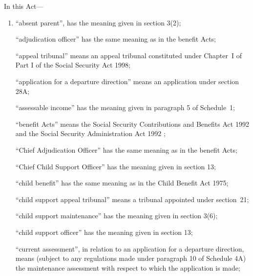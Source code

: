 \documentclass[12pt,a4paper]{article}
\begin{document}
In this Act—
\begin{enumerate}\item[]
    “absent parent”, has the meaning given in section 3(2);

    “adjudication officer” has the same meaning as in the benefit Acts;

“appeal tribunal” means an appeal tribunal constituted under Chapter~I of Part I of the Social Security Act 1998;

“application for a departure direction” means an application under section 28A;

    “assessable income” has the meaning given in paragraph 5 of Schedule~1;

    “benefit Acts” means the 
Social Security Contributions and Benefits Act 1992 and the Social Security Administration Act 1992%
;

    “Chief Adjudication Officer” has the same meaning as in the benefit Acts;

    “Chief Child Support Officer” has the meaning given in section 13;

    “child benefit” has the same meaning as in the Child Benefit Act 1975;

    “child support appeal tribunal” means a tribunal appointed under section~21;

    “child support maintenance” has the meaning given in section 3(6);

    “child support officer” has the meaning given in section 13;

“current assessment”, in relation to an application for a departure direction, means (subject to any regulations made under paragraph 10 of Schedule 4A) the maintenance assessment with respect to which the application is made;


\end{enumerate}
\end{document}
